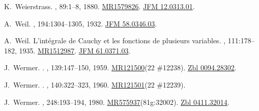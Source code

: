 \documentclass[11pt,a4paper, final, twoside]{article}
\numberwithin{equation}{section}
\begin{document}
\begin{appendices}
\begin{thebibliography}{100}
K.~Weierstrass.
, 89:1--8,
  1880.
\newblock \href{http://www.ams.org/mathscinet-getitem?mr=1579826}{MR1579826}.
  \href{http://zbmath.org/?q=an:12.0313.01}{JFM 12.0313.01}.

A.~Weil.
, 194:1304--1305, 1932.
\newblock \href{http://zbmath.org/?q=an:58.0346.03}{JFM 58.0346.03}.

A.~Weil.
\newblock L'int\'egrale de {C}auchy et les fonctions de plusieurs variables.
, 111:178--182, 1935.
\newblock \href{http://www.ams.org/mathscinet-getitem?mr=1512987}{MR1512987}.
  \href{http://zbmath.org/?q=an:61.0371.03}{JFM 61.0371.03}.

J.~Wermer.
.
, 139:147--150, 1959.
\newblock \href{http://www.ams.org/mathscinet-getitem?mr=121500}{MR121500}(22
  \#12238). \href{http://zbmath.org/?q=an:0094.28302}{Zbl 0094.28302}.

J.~Wermer.
.
, 140:322--323, 1960.
\newblock \href{http://www.ams.org/mathscinet-getitem?mr=121501}{MR121501}(22
  \#12239).

J.~Wermer.
, 248:193--194, 1980.
\newblock
  \href{http://www.ams.org/mathscinet-getitem?mr=575937}{MR575937}(81g:32002).
  \href{http://zbmath.org/?q=an:0411.32014}{Zbl 0411.32014}.

\end{thebibliography}

\end{appendices}
\end{document}
